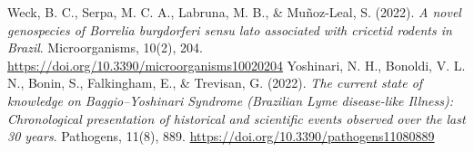 \documentclass[11pt,letterpaper]{article}
\begin{document}
\begin{thebibliography}
 Weck, B. C., Serpa, M. C. A., Labruna, M. B., \& Muñoz-Leal, S. (2022). \textit{A novel genospecies of Borrelia burgdorferi sensu lato associated with cricetid rodents in Brazil}. Microorganisms, 10(2), 204. \url{https://doi.org/10.3390/microorganisms10020204}
 Yoshinari, N. H., Bonoldi, V. L. N., Bonin, S., Falkingham, E., \& Trevisan, G. (2022). \textit{The current state of knowledge on Baggio–Yoshinari Syndrome (Brazilian Lyme disease-like Illness): Chronological presentation of historical and scientific events observed over the last 30 years}. Pathogens, 11(8), 889. \url{https://doi.org/10.3390/pathogens11080889}
\end{thebibliography}
\end{document}
